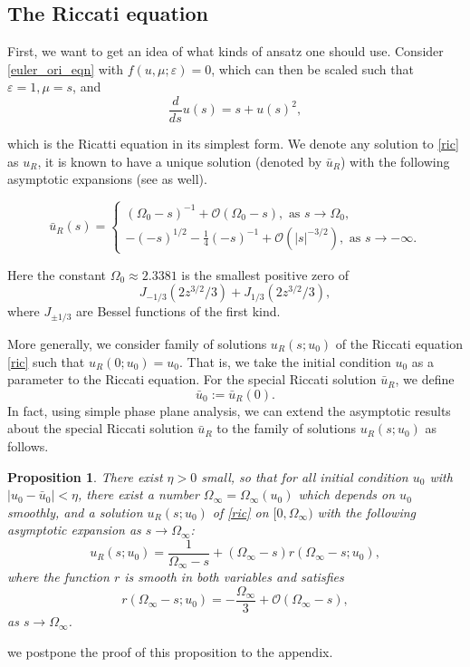 \documentclass[letterpaper,11pt]{article}
\newcommand{\rmO}{\mathcal{O}}
\newcommand{\eps}{\varepsilon}
\numberwithin{equation}{section}
\theoremstyle{plain}
\newtheorem{Proposition}[Lemma]{Proposition}
\begin{document}
\subsection{The Riccati equation}\label{Ric_def}
First, we want to get an idea of what kinds of ansatz one should use. Consider \eqref{euler_ori_eqn} with $f(u,\mu;\eps) = 0$, which can then be scaled such that $\eps = 1, \mu = s$, and 
\begin{equation}\label{ric}
\frac{d}{ds}u(s) = s+u(s)^2,
\end{equation}

which is the Ricatti equation in its simplest form. We denote any solution to \eqref{ric} as $u_R$, it is known to have a unique solution (denoted by $\bar{u}_R$) with the following asymptotic expansions (see \cite{KrupaSz} as well).

\begin{equation} \label{ric_asy}
\bar{u}_R(s)=\begin{cases}
  (\Omega_0-s)^{-1}+\rmO(\Omega_0-s), \text{ as }s \to \Omega_0, \\
 -(-s)^{1/2} -\frac{1}{4}(-s)^{-1} + \rmO(|s|^{-3/2}), \text{ as }s \to -\infty.
\end{cases}
\end{equation}

Here the constant $\Omega_0 \approx 2.3381$ is the smallest positive zero of 
\[
J_{-1/3}(2z^{3/2}/3)+J_{1/3}(2z^{3/2}/3),
\]
where $J_{\pm 1/3}$ are Bessel functions of the first kind.


More generally, we consider family of solutions  $u_R(s; u_0)$ of the Riccati equation  \eqref{ric} such that $u_R(0; u_0) = u_0$. That is, we take the initial condition $u_0$ as a parameter to the Riccati equation. For the special Riccati solution $\bar{u}_R$, we define
\begin{equation}\label{def:bar_u_0}
 \bar{u}_0:= \bar{u}_R(0).
\end{equation} 
In fact, using simple phase plane analysis, we can extend the asymptotic results about the special Riccati solution $\bar{u}_R$ to the family of solutions $u_R(s; u_0)$ as follows.

\begin{Proposition}\label{para_ric}
There exist $\eta>0$ small, so that for all initial condition $u_0$ with $|u_0- \bar{u}_0|<\eta$, there exist a number $\Omega_\infty=\Omega_\infty(u_0)$ which depends on $u_0$ smoothly, and a solution $u_R(s;u_0)$ of \eqref{ric} on $[0, \Omega_\infty)$ with the following asymptotic expansion as $s\to \Omega_\infty$:
\begin{equation}\label{ric_exp}
u_R(s;u_0) = \frac{1}{\Omega_\infty-s} +  (\Omega_\infty-s) r(\Omega_\infty-s;u_0),
\end{equation}
where the function $r$ is smooth in both variables and satisfies
\begin{equation}\label{ric_reminder}
r( \Omega_\infty-s; u_0) = -\frac{\Omega_\infty}{3} + \rmO(\Omega_\infty-s),
\end{equation}
as $s \to \Omega_\infty$.
\end{Proposition}
we postpone the proof of this proposition to the appendix.
\end{document}
